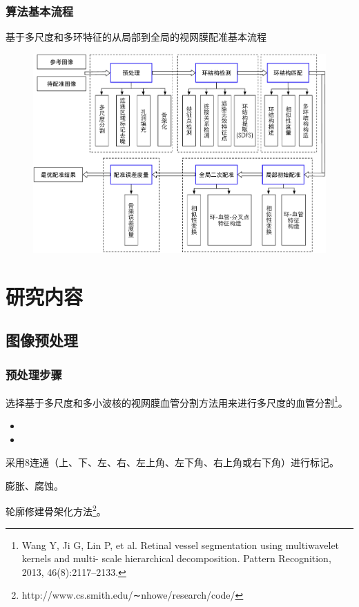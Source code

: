 \documentclass[notheorems,mathserif,table,compress]{beamer}  %
\begin{document}
 \begin{frame}
\frametitle{算法基本流程}
基于多尺度和多环特征的从局部到全局的视网膜配准基本流程
 \begin{figure}[ht!]
    \centering
  \includegraphics[width=0.8\linewidth]{流程图}
 \end{figure}
 \end{frame}
 
\section{研究内容}
\subsection{图像预处理}

 \begin{frame}
\frametitle{预处理步骤}
{} 选择基于多尺度和多小波核的视网膜血管分割方法用来进行多尺度的血管分割\footnote{Wang Y, Ji G, Lin P, et al. Retinal vessel segmentation using multiwavelet kernels and multi- scale hierarchical decomposition. Pattern Recognition, 2013, 46(8):2117–2133.}。
\begin{itemize}
\item {\color{red}{不同尺度的分割结果代表不同程度的细节信息，我们选择其中的14个尺度。}}
\item {\color{red}{可有效避免因分割结果不理想造成的特征提取失败。}}
\end{itemize}
{} 采用8连通（上、下、左、右、左上角、左下角、右上角或右下角）进行标记。

{} 膨胀、腐蚀。

{} 轮廓修建骨架化方法\footnote{http://www.cs.smith.edu/∼nhowe/research/code/}。
 \end{frame}
\end{document}
